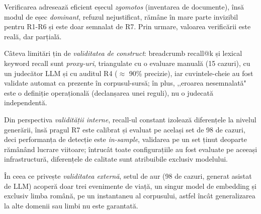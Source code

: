 Verificarea adresează eficient eșecul \emph{zgomotos} (inventarea de documente), însă modul de eșec \emph{dominant}, refuzul nejustificat, rămâne în mare parte invizibil pentru R1-R6 și este doar semnalat de R7. Prin urmare, valoarea verificării este reală, dar parțială.

Câteva limitări țin de \emph{validitatea de construct}: breadcrumb recall@k și lexical keyword recall sunt \emph{proxy-uri}, triangulate cu o evaluare manuală (15 cazuri), cu un judecător LLM și cu auditul R4 ($\approx$ 90\% precizie), iar cuvintele-cheie au fost validate automat ca prezente în corpusul-sursă; în plus, ,,eroarea nesemnalată" este o definiție operațională (declanșarea unei reguli), nu o judecată independentă.

Din perspectiva \emph{validității interne}, recall-ul constant izolează diferențele la nivelul generării, însă pragul R7 este calibrat și evaluat pe același set de 98 de cazuri, deci performanța de detecție este \emph{in-sample}, validarea pe un set ținut deoparte rămânând lucrare viitoare; întrucât toate configurațiile au fost evaluate pe aceeași infrastructură, diferențele de calitate sunt atribuibile exclusiv modelului.

În ceea ce privește \emph{validitatea externă}, setul de aur (98 de cazuri, generat asistat de LLM) acoperă doar trei evenimente de viață, un singur model de embedding și exclusiv limba română, pe un instantaneu al corpusului, astfel încât generalizarea la alte domenii sau limbi nu este garantată.
